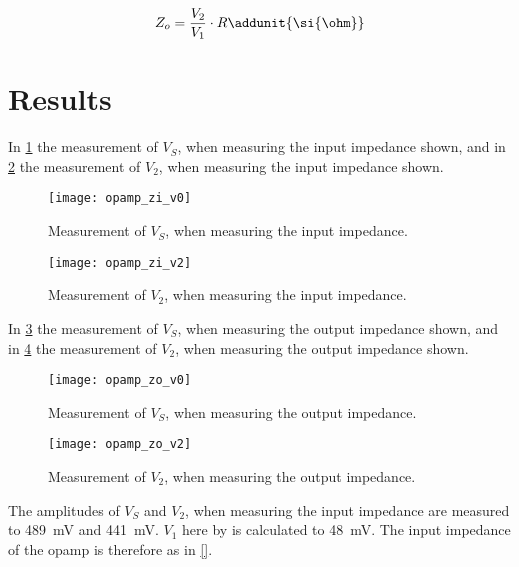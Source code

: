 \begin{equation}\label{eq:opamp_zo}
        Z_o = \frac{V_2}{V_1} \cdot R
        \addunit{\si{\ohm}}
    \end{equation}

    \startexplain
    \stopexplain

\section{Results}

In \ref{fig:opamp_zi_v0} the measurement of $V_S$, when measuring the input impedance shown, and in \ref{fig:opamp_zi_v2} the measurement of $V_2$, when measuring the input impedance shown. \\

\begin{figure}[hbt]
  \centering
  \texttt{[image: opamp\_zi\_v0]}
  \caption{Measurement of $V_S$, when measuring the input impedance.}
  \label{fig:opamp_zi_v0}
\end{figure}

\begin{figure}[hbt]
  \centering
  \texttt{[image: opamp\_zi\_v2]}
  \caption{Measurement of $V_2$, when measuring the input impedance.}
  \label{fig:opamp_zi_v2}
\end{figure}

In \ref{fig:opamp_zo_v0} the measurement of $V_S$, when measuring the output impedance shown, and in \ref{fig:opamp_zo_v2} the measurement of $V_2$, when measuring the output impedance shown. \\

\begin{figure}[hbt]
  \centering
  \texttt{[image: opamp\_zo\_v0]}
  \caption{Measurement of $V_S$, when measuring the output impedance.}
  \label{fig:opamp_zo_v0}
\end{figure}

\begin{figure}[hbt]
  \centering
  \texttt{[image: opamp\_zo\_v2]}
  \caption{Measurement of $V_2$, when measuring the output impedance.}
  \label{fig:opamp_zo_v2}
\end{figure}

The amplitudes of $V_S$ and $V_2$, when measuring the input impedance are measured to \SI{489}{\milli\volt} and \SI{441}{\milli\volt}. $V_1$ here by is calculated to \SI{48}{\milli\volt}. The input impedance of the \gls{opamp} is therefore as in \autoref{}.

